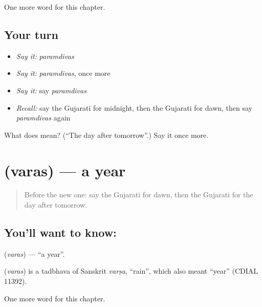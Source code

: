 \begin{grammarlens}[title={What you've built}]
One more word for this chapter.
\end{grammarlens}

\subsection*{Your turn}
\begin{itemize}
\raggedright
  \item \emph{Say it:} \emph{paramdivas}
  \item \emph{Say it:} \emph{paramdivas}, once more
  \item \emph{Say it:} say \emph{paramdivas}
  \item \emph{Recall:} say the Gujarati for midnight, then the Gujarati for dawn, then say \emph{paramdivas} again
\end{itemize}

\begin{tcolorbox}[breakable,colback=teal!4,colframe=teal!35!black,title={Before you move on}]
What does  mean? (\textquotedblleft{}The day after tomorrow\textquotedblright{}.) Say it once more.
\end{tcolorbox}
\section[\texorpdfstring{\gu{વરસ} (varas)}{વરસ (varas)}]{ (varas) — a year}

\label{lesson:GU-C92-varas}



\begin{quote}
Before the new one: say the Gujarati for dawn, then the Gujarati for the day after tomorrow.
\end{quote}

\subsection*{You'll want to know: }
\textbf{} (\emph{varas}) — \textquotedblleft{}a year\textquotedblright{}.

\begin{cousinweb}
\textbf{} (\emph{varas}) is a tadbhava of Sanskrit \emph{varṣa}, \textquotedblleft{}rain\textquotedblright{}, which also meant \textquotedblleft{}year\textquotedblright{} (CDIAL 11392).
\end{cousinweb}

\begin{grammarlens}[title={What you've built}]
One more word for this chapter.
\end{grammarlens}

